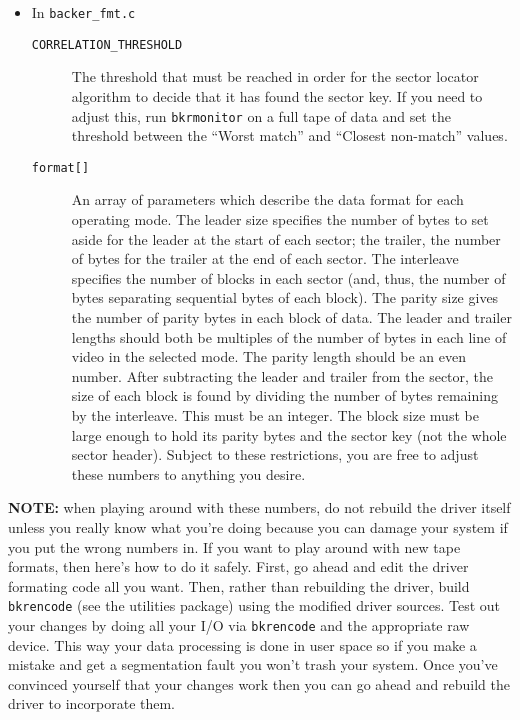 \documentclass{article}
\begin{document}
\begin{itemize}
\item
In \texttt{backer\_fmt.c}
\begin{description}
\item[\texttt{CORRELATION\_THRESHOLD}]
The threshold that must be reached in order for the sector locator
algorithm to decide that it has found the sector key.  If you need to
adjust this, run \texttt{bkrmonitor} on a full tape of data and set the
threshold between the ``Worst match'' and ``Closest non-match'' values.

\item[\texttt{format[]}]
An array of parameters which describe the data format for each operating
mode.  The leader size specifies the number of bytes to set aside for the
leader at the start of each sector;  the trailer, the number of bytes for
the trailer at the end of each sector.  The interleave specifies the number
of blocks in each sector (and, thus, the number of bytes separating
sequential bytes of each block).  The parity size gives the number of
parity bytes in each block of data.  The leader and trailer lengths should
both be multiples of the number of bytes in each line of video in the
selected mode.  The parity length should be an even number.  After
subtracting the leader and trailer from the sector, the size of each block
is found by dividing the number of bytes remaining by the interleave.  This
must be an integer.  The block size must be large enough to hold its parity
bytes and the sector key (not the whole sector header).  Subject to these
restrictions, you are free to adjust these numbers to anything you desire.
\end{description}

\end{itemize}
\textbf{NOTE:}  when playing around with these numbers, do not rebuild the
driver itself unless you really know what you're doing because you can
damage your system if you put the wrong numbers in.  If you want to play
around with new tape formats, then here's how to do it safely.  First, go
ahead and edit the driver formating code all you want.  Then, rather than
rebuilding the driver, build \texttt{bkrencode} (see the utilities package)
using the modified driver sources.  Test out your changes by doing all your
I/O via \texttt{bkrencode} and the appropriate raw device.  This way your
data processing is done in user space so if you make a mistake and get a
segmentation fault you won't trash your system.  Once you've convinced
yourself that your changes work then you can go ahead and rebuild the
driver to incorporate them.
\end{document}
